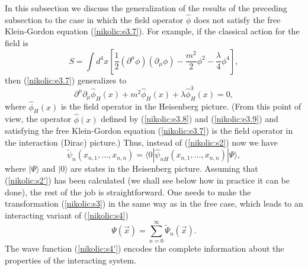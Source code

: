 \documentclass[12pt,twoside]{report} %
\begin{document}
In this subsection we discuss the generalization of the results of the preceding subsection
to the case in which the field operator $\hat{\phi}$ does not satisfy the free 
Klein-Gordon equation (\ref{nikolic:e3.7}). For example,
if the classical action for the field is
\begin{equation}\label{nikolic:e3.44}
 S=\int d^4x  \left[ \frac{1}{2}(\partial^{\mu}\phi) (\partial_{\mu}\phi)
-\frac{m^2}{2}\phi^2 - \frac{\lambda}{4}\phi^4 \right] ,
\end{equation}
then (\ref{nikolic:e3.7}) generalizes to
 \begin{equation}\label{nikolic:e3.45}
 \partial^{\mu}\partial_{\mu}\hat{\phi}_H(x)+ 
m^2\hat{\phi}_H(x) +\lambda \hat{\phi}_H^3(x)=0, 
\end{equation}
where $\hat{\phi}_H(x)$ is the field operator in the Heisenberg picture.
(From this point of view, the operator $\hat{\phi}(x)$ 
defined by (\ref{nikolic:e3.8}) and (\ref{nikolic:e3.9}) and satisfying the free Klein-Gordon 
equation (\ref{nikolic:e3.7}) is the field operator in the interaction (Dirac) picture.)
Thus, instead of (\ref{nikolic:s2}) now we have
\begin{equation}\label{nikolic:s2'}
 \tilde{\psi}_n(x_{n,1},\ldots,x_{n,n}) =
\langle 0|\hat{\psi}_{nH}(x_{n,1},\ldots,x_{n,n})|\Psi\rangle ,
\end{equation}
where $|\Psi\rangle$ and $|0\rangle$ are states in the Heisenberg picture.
Assuming that (\ref{nikolic:s2'}) has been calculated (we shall see below how
in practice it can be done), the rest of the job is straightforward.
One needs to make the transformation (\ref{nikolic:s3}) in the same way
as in the free case, which leads to an interacting variant of  (\ref{nikolic:s4})
\begin{equation}\label{nikolic:s4'}
\Psi(\vec{x})=\sum_{n=0}^{\infty} \tilde{\Psi}_n(\vec{x}) .
\end{equation}
The wave function (\ref{nikolic:s4'}) encodes the complete information about the
properties of the interacting system. 
\end{document}
